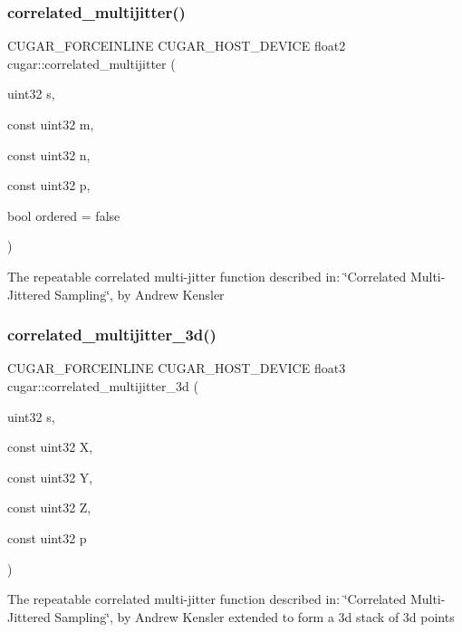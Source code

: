 \subsubsection{\texorpdfstring{correlated\+\_\+multijitter()}{correlated\_multijitter()}}
{\footnotesize\ttfamily C\+U\+G\+A\+R\+\_\+\+F\+O\+R\+C\+E\+I\+N\+L\+I\+NE C\+U\+G\+A\+R\+\_\+\+H\+O\+S\+T\+\_\+\+D\+E\+V\+I\+CE float2 cugar\+::correlated\+\_\+multijitter (\begin{DoxyParamCaption}\item[{uint32}]{s,  }\item[{const uint32}]{m,  }\item[{const uint32}]{n,  }\item[{const uint32}]{p,  }\item[{bool}]{ordered = {\ttfamily false} }\end{DoxyParamCaption})}

The repeatable correlated multi-\/jitter function described in\+: \char`\"{}\+Correlated Multi-\/\+Jittered Sampling\char`\"{}, by Andrew Kensler \mbox{\label{group__multijitter_ga23bdc35923e1dc33a8d0c35f671b5554}} 
\subsubsection{\texorpdfstring{correlated\+\_\+multijitter\+\_\+3d()}{correlated\_multijitter\_3d()}}
{\footnotesize\ttfamily C\+U\+G\+A\+R\+\_\+\+F\+O\+R\+C\+E\+I\+N\+L\+I\+NE C\+U\+G\+A\+R\+\_\+\+H\+O\+S\+T\+\_\+\+D\+E\+V\+I\+CE float3 cugar\+::correlated\+\_\+multijitter\+\_\+3d (\begin{DoxyParamCaption}\item[{uint32}]{s,  }\item[{const uint32}]{X,  }\item[{const uint32}]{Y,  }\item[{const uint32}]{Z,  }\item[{const uint32}]{p }\end{DoxyParamCaption})}

The repeatable correlated multi-\/jitter function described in\+: \char`\"{}\+Correlated Multi-\/\+Jittered Sampling\char`\"{}, by Andrew Kensler extended to form a 3d stack of 3d points 